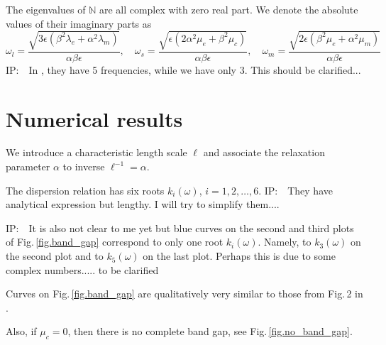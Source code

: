 \documentclass[
10pt, %
a4paper, %
oneside, %
headinclude,footinclude, %
BCOR5mm, %
table,
]{scrartcl}
\newcommand{\IP}[1]{{\color{Red}IP:\ \ #1}}
\begin{document}
The eigenvalues of $ \mathbb{N} $ are all complex with zero real part. We denote the absolute 
values of their imaginary 
parts as
\begin{equation}
\omega_l = \frac{\sqrt{3\epsilon(\beta^2 \lambda_e + \alpha^2 
\lambda_m)}}{\alpha\beta\epsilon},\quad
%
\omega_s = \frac{\sqrt{\epsilon (2 \alpha^2 \mu_e + \beta^2 \mu_c)}}{\alpha \beta \epsilon},\quad
%
\omega_m = \frac{\sqrt{2\epsilon (\beta^2 \mu_e + \alpha^2 \mu_m)}}{\alpha \beta \epsilon}
\end{equation}
\IP{In \cite{Madeo2015a}, they have 5 frequencies, while we have only 3. This should be 
clarified...}


\section{Numerical results}


We introduce a characteristic length scale $ \ell $ and associate the relaxation parameter $ \alpha 
$ to inverse $ \ell^{-1} = \alpha $.

The dispersion relation has six roots $ k_i(\omega) $, $ i=1,2,\ldots,6 $.
\IP{They have analytical expression but lengthy. I will try to simplify them....}

\IP{It is also not clear to me yet but blue curves on the second and third plots of 
Fig.\,\ref{fig.band_gap} correspond to only one root $ k_i(\omega) $. Namely, to $ k_3(\omega) $ on 
the second plot and to $ k_5(\omega) $ on the last plot. Perhaps this is due to 
some complex numbers..... to be clarified}

Curves on Fig.\,\ref{fig.band_gap} are qualitatively very similar to those from Fig.\,2 in 
\cite{Madeo2015a}.

Also, if $ \mu_c = 0 $, then there is no complete band gap, see Fig.\,\ref{fig.no_band_gap}.
\end{document}
